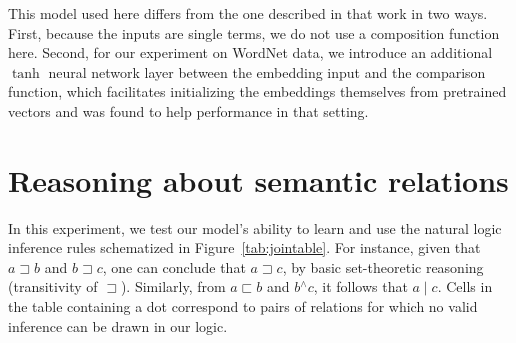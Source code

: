 \documentclass[letterpaper]{article}
\newcommand{\natneg}{\mathbin{^{\wedge}}}
\newcommand{\natfor}{\sqsubset}
\newcommand{\natrev}{\sqsupset}
\newcommand{\natalt}{\mathbin{|}}
\def\ii#1{\textit{#1}}
\begin{document}
This model used here differs from the one described in that work in
two ways. First, because the inputs are single terms, we do not use
a composition function here. Second, for our experiment on WordNet data, 
we introduce an additional $\tanh$ neural network layer between the embedding 
input and the comparison function, which facilitates initializing the 
embeddings themselves from pretrained vectors and was found to help 
performance in that setting.


\section{Reasoning about semantic relations}\label{sec:join}

In this experiment, we test our model's ability to learn and use
the natural logic inference rules schematized in 
Figure~\ref{tab:jointable}. For instance, given that $a \natrev b$ and $b
\natrev c$, one can conclude that $a \natrev c$, by basic
set-theoretic reasoning (transitivity of $\natrev$). Similarly, from
$a \natfor b$ and $b \natneg c$, it follows that $a \natalt c$. Cells in the
table containing a dot correspond to pairs of relations for which no valid 
inference can be drawn in our logic.

\end{document}
